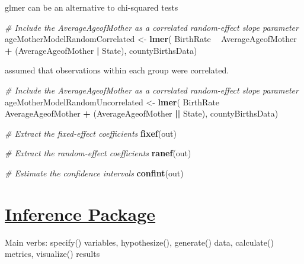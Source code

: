 \documentclass[]{book}
\newenvironment{Shaded}{\begin{snugshade}}{\end{snugshade}}
\newcommand{\KeywordTok}[1]{\textcolor[rgb]{0.13,0.29,0.53}{\textbf{#1}}}
\newcommand{\DataTypeTok}[1]{\textcolor[rgb]{0.13,0.29,0.53}{#1}}
\newcommand{\DecValTok}[1]{\textcolor[rgb]{0.00,0.00,0.81}{#1}}
\newcommand{\StringTok}[1]{\textcolor[rgb]{0.31,0.60,0.02}{#1}}
\newcommand{\CommentTok}[1]{\textcolor[rgb]{0.56,0.35,0.01}{\textit{#1}}}
\newcommand{\OperatorTok}[1]{\textcolor[rgb]{0.81,0.36,0.00}{\textbf{#1}}}
\newcommand{\NormalTok}[1]{#1}
\theoremstyle{definition}
\theoremstyle{definition}
\theoremstyle{definition}
\theoremstyle{remark}
\begin{document}
glmer can be an alternative to chi-squared tests

\begin{Shaded}
\begin{Highlighting}[]
\CommentTok{# Include the AverageAgeofMother as a correlated random-effect slope parameter}
\NormalTok{ageMotherModelRandomCorrelated <-}\StringTok{ }\KeywordTok{lmer}\NormalTok{( BirthRate }\OperatorTok{~}\StringTok{ }\NormalTok{AverageAgeofMother }\OperatorTok{+}\StringTok{ }\NormalTok{(AverageAgeofMother }\OperatorTok{|}\StringTok{ }\NormalTok{State),}
\NormalTok{                       countyBirthsData)}

\NormalTok{ assumed that observations within each group were correlated.}

\CommentTok{# Include the AverageAgeofMother as a correlated random-effect slope parameter}
\NormalTok{ageMotherModelRandomUncorrelated <-}\StringTok{ }\KeywordTok{lmer}\NormalTok{( BirthRate }\OperatorTok{~}\StringTok{ }\NormalTok{AverageAgeofMother }\OperatorTok{+}\StringTok{ }\NormalTok{(AverageAgeofMother }\OperatorTok{||}\StringTok{ }\NormalTok{State),}
\NormalTok{                       countyBirthsData)}


\CommentTok{# Extract the fixed-effect coefficients}
\KeywordTok{fixef}\NormalTok{(out)}

\CommentTok{# Extract the random-effect coefficients}
\KeywordTok{ranef}\NormalTok{(out)}

\CommentTok{# Estimate the confidence intervals }
\KeywordTok{confint}\NormalTok{(out)}
\end{Highlighting}
\end{Shaded}

\section{\texorpdfstring{\href{https://cran.r-project.org/web/packages/infer/infer.pdf}{Inference
Package}}{Inference Package}}\label{inference-package}

Main verbs: specify() variables, hypothesize(), generate() data,
calculate() metrics, visualize() results

\begin{Shaded}
\end{Shaded}
\end{document}
